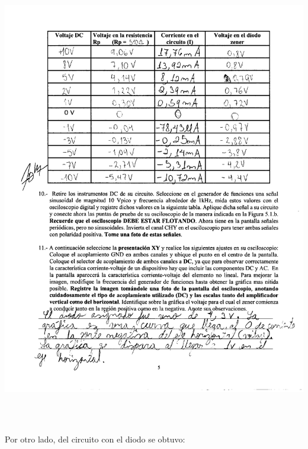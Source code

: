 \documentclass[12pt]{article}
\begin{document}
	\begin{center}
		\includegraphics[width=16cm,height=20cm]{Img/anexo_0003}
	\end{center}

	\noindent Por otro lado, del circuito con el diodo se obtuvo:
	
\end{document}
